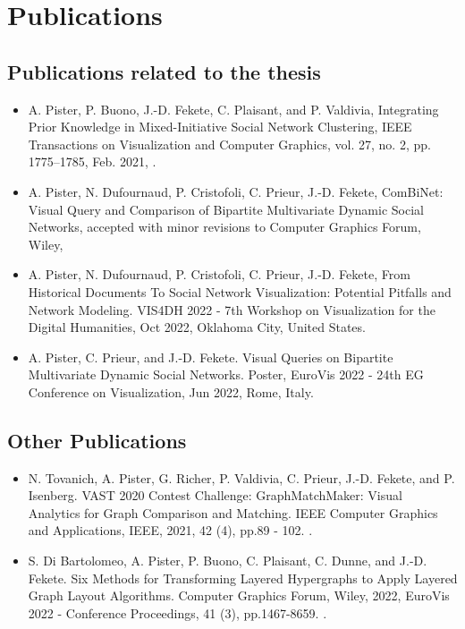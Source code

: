 \chapter*{Publications}

\section*{Publications related to the thesis}

\begin{itemize}
    \item A. Pister, P. Buono, J.-D. Fekete, C. Plaisant, and P. Valdivia, Integrating Prior Knowledge in Mixed-Initiative Social Network Clustering, IEEE Transactions on Visualization and Computer Graphics, vol. 27, no. 2, pp. 1775–1785, Feb. 2021, .
    \item A. Pister, N. Dufournaud, P. Cristofoli, C. Prieur, J.-D. Fekete, ComBiNet: Visual Query and Comparison of Bipartite Multivariate Dynamic Social Networks, accepted with minor revisions to Computer Graphics Forum, Wiley, 
    \item A. Pister, N. Dufournaud, P. Cristofoli, C. Prieur, J.-D. Fekete, From Historical Documents To Social Network Visualization: Potential Pitfalls and Network Modeling. VIS4DH 2022 - 7th Workshop on Visualization for the Digital Humanities, Oct 2022, Oklahoma City, United States.
    \item  A. Pister, C. Prieur, and J.-D. Fekete. Visual Queries on Bipartite Multivariate Dynamic Social Networks. Poster, EuroVis 2022 - 24th EG Conference on Visualization, Jun 2022, Rome, Italy. 
\end{itemize}


\section*{Other Publications}

\begin{itemize}
    \item N. Tovanich, A. Pister, G. Richer, P. Valdivia, C. Prieur, J.-D. Fekete, and P. Isenberg. VAST 2020 Contest Challenge: GraphMatchMaker: Visual Analytics for Graph Comparison and Matching. IEEE Computer Graphics and Applications, IEEE, 2021, 42 (4), pp.89 - 102. .
    \item S. Di Bartolomeo, A. Pister, P. Buono, C. Plaisant, C. Dunne, and J.-D. Fekete. Six Methods for Transforming Layered Hypergraphs to Apply Layered Graph Layout Algorithms. Computer Graphics Forum, Wiley, 2022, EuroVis 2022 - Conference Proceedings, 41 (3), pp.1467-8659.  .
\end{itemize}
